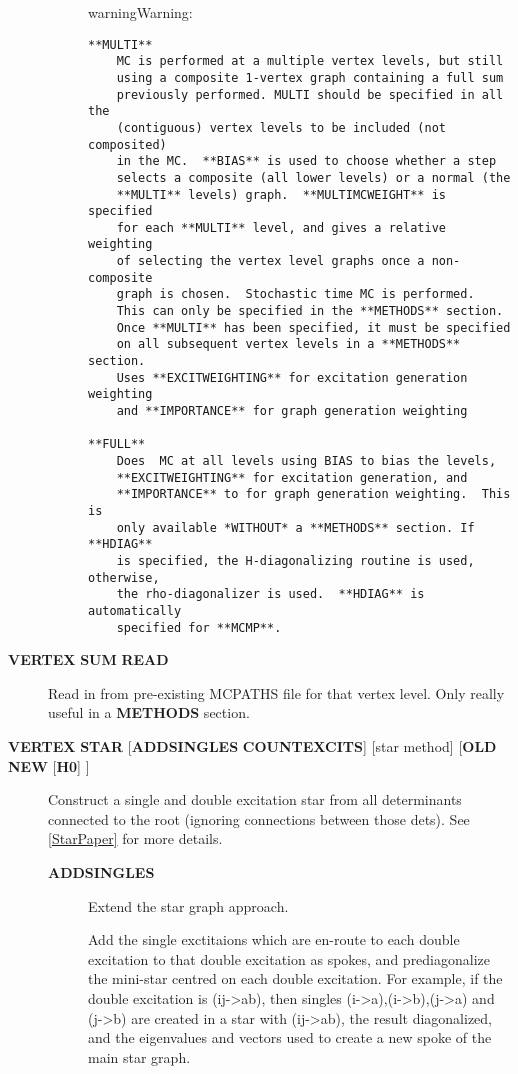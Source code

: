 \documentclass[openany,a4paper,10pt,english]{manual}
\begin{document}
\begin{description}
\begin{description}
\begin{notice}{warning}{Warning:}
\begin{Verbatim}[commandchars=@\[\]]
**MULTI**
    MC is performed at a multiple vertex levels, but still
    using a composite 1-vertex graph containing a full sum
    previously performed. MULTI should be specified in all the
    (contiguous) vertex levels to be included (not composited)
    in the MC.  **BIAS** is used to choose whether a step
    selects a composite (all lower levels) or a normal (the
    **MULTI** levels) graph.  **MULTIMCWEIGHT** is specified
    for each **MULTI** level, and gives a relative weighting
    of selecting the vertex level graphs once a non-composite
    graph is chosen.  Stochastic time MC is performed.
    This can only be specified in the **METHODS** section.
    Once **MULTI** has been specified, it must be specified
    on all subsequent vertex levels in a **METHODS** section.
    Uses **EXCITWEIGHTING** for excitation generation weighting
    and **IMPORTANCE** for graph generation weighting

**FULL**
    Does  MC at all levels using BIAS to bias the levels,
    **EXCITWEIGHTING** for excitation generation, and
    **IMPORTANCE** to for graph generation weighting.  This is
    only available *WITHOUT* a **METHODS** section. If **HDIAG**
    is specified, the H-diagonalizing routine is used, otherwise,
    the rho-diagonalizer is used.  **HDIAG** is automatically
    specified for **MCMP**.
\end{Verbatim}
\end{notice}

\end{description}

\item[\textbf{VERTEX} \textbf{SUM} \textbf{READ}] \leavevmode
Read in from pre-existing MCPATHS file for that vertex level.
Only really useful in a \textbf{METHODS} section.

\item[\textbf{VERTEX} \textbf{STAR} {[}\textbf{ADDSINGLES} \textbf{COUNTEXCITS}{]} {[}star method{]} {[}\textbf{OLD} \textbf{NEW} {[}\textbf{H0}{]} {]}] \leavevmode
Construct a single and double excitation star from all determinants
connected to the root (ignoring connections between those dets).
See \hyperlink{starpaper}{{[}StarPaper{]}} for more details.
\begin{description}
\item[\textbf{ADDSINGLES}] \leavevmode
Extend the star graph approach.

Add the single exctitaions which are en-route to each double
excitation to that double excitation as spokes, and prediagonalize
the mini-star centred on each double excitation.  For example,
if the double excitation is (ij-\textgreater{}ab), then singles
(i-\textgreater{}a),(i-\textgreater{}b),(j-\textgreater{}a) and (j-\textgreater{}b) are created in a star with
(ij-\textgreater{}ab), the result diagonalized, and the eigenvalues and
vectors used to create a new spoke of the main star graph.


\end{description}
\end{description}
\end{document}
